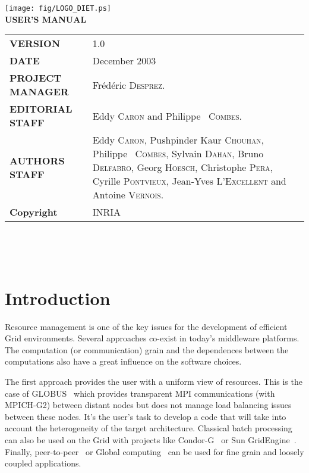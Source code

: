 \documentclass[12pt,a4paper]{book}
\begin{document}

\thispagestyle{empty}
\vspace*{3cm}
\vspace*{3cm}

\begin{center}
\texttt{[image: fig/LOGO\_DIET.ps]}\\[2ex]
\textbf{\Huge USER'S MANUAL\\[2ex]}
\end{center}

\vfill


\noindent
\small{
\begin{tabular}{ll}
  \textbf{VERSION}  & 1.0\\
  \textbf{DATE}     & December 2003\\
  \textbf{PROJECT MANAGER}  & Fr\'ed\'eric \textsc{Desprez}.\\
  \textbf{EDITORIAL STAFF}  & Eddy \textsc{Caron} and Philippe ~\textsc{Combes}.\\
  \textbf{AUTHORS STAFF}    & 
\begin{minipage}[t]{12cm}
  Eddy \textsc{Caron}, Pushpinder Kaur \textsc{Chouhan}, Philippe ~\textsc{Combes},
  Sylvain \textsc{Dahan}, Bruno \textsc{Delfabro}, Georg \textsc{Hoesch}, Christophe \textsc{Pera}, Cyrille \textsc{Pontvieux}, Jean-Yves \textsc{L'Excellent} and Antoine \textsc{Vernois}.
\end{minipage} \\
  \textbf{Copyright}& INRIA
\end{tabular}\\
}

\newpage
\thispagestyle{empty}
\ 



\newpage
\tableofcontents


%
%
\newpage
{}
\chapter*{Introduction}

Resource management is one of the key issues for the development of efficient Grid environments. Several approaches co-exist in today's middleware platforms. The computation (or communication) grain and the dependences between the computations also have a great influence on the software choices.

The first approach provides the user with a uniform view of resources. This is the case of GLOBUS~\cite{Globus} which provides transparent MPI communications (with MPICH-G2) between distant nodes but does not manage load balancing issues between these nodes. It's the user's task to develop a code that will take into account the heterogeneity of the target architecture. Classical batch processing can also be used on the Grid with projects like Condor-G~\cite{Condor} or Sun GridEngine~\cite{SunGridEngine}. Finally, peer-to-peer~\cite{Oram01} or Global computing~\cite{germain01global} can be used for fine grain and loosely coupled applications.
\end{document}
